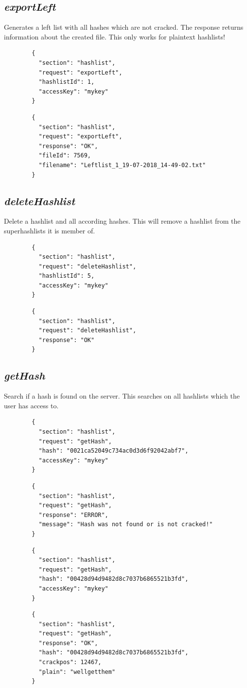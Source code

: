\subsection*{\textit{exportLeft}}
	Generates a left list with all hashes which are not cracked. The response returns information about the created file. This only works for plaintext hashlists!
	{
		\color{blue}
		\begin{verbatim}
		{
		  "section": "hashlist",
		  "request": "exportLeft",
		  "hashlistId": 1,
		  "accessKey": "mykey"
		}
		\end{verbatim}
	}
	{
		\color{OliveGreen}
		\begin{verbatim}
		{
		  "section": "hashlist",
		  "request": "exportLeft",
		  "response": "OK",
		  "fileId": 7569,
		  "filename": "Leftlist_1_19-07-2018_14-49-02.txt"
		}
		\end{verbatim}
	}
\subsection*{\textit{deleteHashlist}}
	Delete a hashlist and all according hashes. This will remove a hashlist from the superhashlists it is member of.
	{
		\color{blue}
		\begin{verbatim}
		{
		  "section": "hashlist",
		  "request": "deleteHashlist",
		  "hashlistId": 5,
		  "accessKey": "mykey"
		}
		\end{verbatim}
	}
	{
		\color{OliveGreen}
		\begin{verbatim}
		{
		  "section": "hashlist",
		  "request": "deleteHashlist",
		  "response": "OK"
		}
		\end{verbatim}
	}
\subsection*{\textit{getHash}}
	Search if a hash is found on the server. This searches on all hashlists which the user has access to.
	{
		\color{blue}
		\begin{verbatim}
		{
		  "section": "hashlist",
		  "request": "getHash",
		  "hash": "0021ca52049c734ac0d3d6f92042abf7",
		  "accessKey": "mykey"
		}
		\end{verbatim}
	}
	{
		\color{OliveGreen}
		\begin{verbatim}
		{
		  "section": "hashlist",
		  "request": "getHash",
		  "response": "ERROR",
		  "message": "Hash was not found or is not cracked!"
		}
		\end{verbatim}
	}
	{
		\color{blue}
		\begin{verbatim}
		{
		  "section": "hashlist",
		  "request": "getHash",
		  "hash": "00428d94d9482d8c7037b6865521b3fd",
		  "accessKey": "mykey"
		}
		\end{verbatim}
	}
	{
		\color{OliveGreen}
		\begin{verbatim}
		{
		  "section": "hashlist",
		  "request": "getHash",
		  "response": "OK",
		  "hash": "00428d94d9482d8c7037b6865521b3fd",
		  "crackpos": 12467,
		  "plain": "wellgetthem"
		}
		\end{verbatim}
	}
